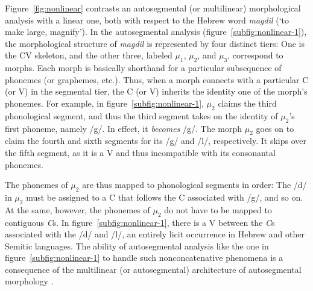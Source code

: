  Figure~\ref{fig:nonlinear} contrasts an autosegmental (or multilinear) morphological analysis  with a linear one, both with respect to the Hebrew word \textit{magdil} (`to make large, magnify').
In the autosegmental analysis (figure~\ref{subfig:nonlinear-1}), the morphological structure of \textit{magdil} is represented by four distinct tiers: One is the CV
skeleton, and the other three, labeled $\mu_1$, $\mu_2$, and $\mu_3$, 
correspond to morphs. Each morph is basically shorthand for a particular 
subsequence of phonemes (or graphemes, etc.). Thus, when a morph connects 
with a particular C (or V) in the segmental tier, the C (or V) inherits the 
identity one of the morph's phonemes. For example,  in 
figure~\ref{subfig:nonlinear-1}, $\mu_2$ claims the third phonological 
segment, and thus the third segment takes on the identity of  $\mu_2$'s first phoneme, 
namely /g/. In effect, it \emph{becomes} /g/. 
The morph $\mu_2$ goes on to claim the fourth and sixth segments for its  
/g/ and /l/, respectively. It skips over the fifth segment, as it is a V and thus incompatible with its consonantal phonemes.

The phonemes of $\mu_2$ are thus mapped to phonological segments in 
order: The /d/ in $\mu_2$ must be assigned to a C that follows the 
C associated with /g/, and so on. 
At the 
same, however, the phonemes of $\mu_2$ do not have to be mapped to contiguous \textit{C}s. In figure~\ref{subfig:nonlinear-1}, there is a V between the \textit{C}s associated with the /d/ and /l/, an entirely licit occurrence in Hebrew and other Semitic languages. 
The ability of autosegmental analysis like the one in figure~\ref{subfig:nonlinear-1} to handle such nonconcatenative phenomena is a consequence of the multilinear 
(or autosegmental) architecture of autosegmental morphology \citep{mccarthy:1981}.


